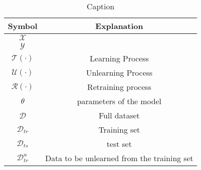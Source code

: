 
\begin{table}[h]
    \centering
    \begin{tabular}{cc}
    \hline
    \hline
         Symbol & Explanation \\
         \hline
         \hline
         $\mathcal{X}$ & \\
         $\mathcal{Y}$ & \\
        $\mathcal{T}(\cdot)$ & Learning Process \\
        $\mathcal{U}(\cdot )$ & Unlearning Process \\
         $\mathcal{R}(\cdot )$ & Retraining process \\
         $\theta$ & parameters of the model\\
         $\mathcal{D}$ & Full dataset \\
         $\mathcal{D}_{tr}$ & Training set \\
         $\mathcal{D}_{ts}$ & test set \\
         $\mathcal{D}_{tr}^u$ & Data to be unlearned from the training set \\
         \hline
         \hline
    \end{tabular}
    \caption{Caption}
    \label{tab:my_label}
\end{table}

